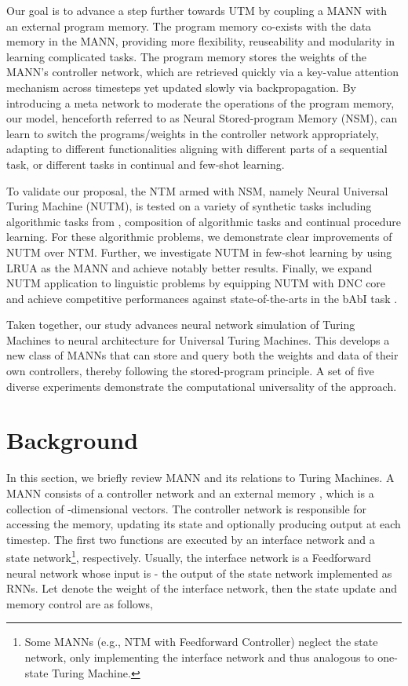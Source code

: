 \documentclass[english]{article}
\renewcommand{\cite}{\citep}
\begin{document}
Our goal is to advance a step further towards UTM by coupling a MANN
with an external program memory. The program memory co-exists with
the data memory in the MANN, providing more flexibility, reuseability
and modularity in learning complicated tasks. The program memory stores
the weights of the MANN's controller network, which are retrieved
quickly via a key-value attention mechanism across timesteps yet updated
slowly via backpropagation. By introducing a meta network to moderate
the operations of the program memory, our model, henceforth referred
to as Neural Stored-program Memory (NSM), can learn to switch the
programs/weights in the controller network appropriately, adapting
to different functionalities aligning with different parts of a sequential
task, or different tasks in continual and few-shot learning.

To validate our proposal, the NTM armed with NSM, namely Neural Universal
Turing Machine (NUTM), is tested on a variety of synthetic tasks including
algorithmic tasks from \citet{graves2014neural}, composition of algorithmic
tasks and continual procedure learning. For these algorithmic problems,
we demonstrate clear improvements of NUTM over NTM. Further, we investigate
NUTM in few-shot learning by using LRUA as the MANN and achieve notably
better results. Finally, we expand NUTM application to linguistic
problems by equipping NUTM with DNC core and achieve competitive performances
against state-of-the-arts in the bAbI task \cite{weston2015towards}. 

Taken together, our study advances neural network simulation of Turing
Machines to neural architecture for Universal Turing Machines. This
develops a new class of MANNs that can store and query both the weights
and data of their own controllers, thereby following the stored-program
principle. A set of five diverse experiments demonstrate the computational
universality of the approach.
 
\section{Background\label{sec:Background}}

In this section, we briefly review MANN and its relations to Turing
Machines. A MANN consists of a controller network and an external
memory , which is a collection
of  -dimensional vectors. The controller network is responsible
for accessing the memory, updating its state and optionally producing
output at each timestep. The first two functions are executed by an
interface network and a state network\footnote{Some MANNs (e.g., NTM with Feedforward Controller) neglect the state
network, only implementing the interface network and thus analogous
to one-state Turing Machine. }, respectively. Usually, the interface network is a Feedforward neural
network whose input is  - the output of the state network
implemented as RNNs. Let  denote the weight of the interface
network, then the state update and memory control are as follows,
\end{document}
